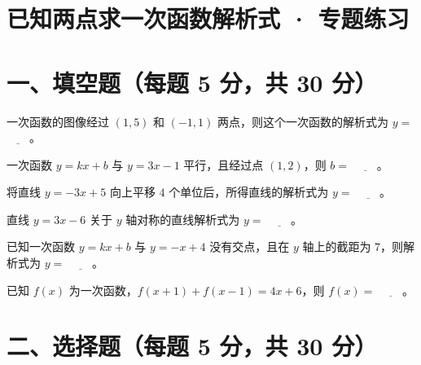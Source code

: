 \documentclass{exam-zh}
\begin{document}
\section*{已知两点求一次函数解析式 · 专题练习}

\section*{一、填空题（每题 5 分，共 30 分）}


\begin{question}[points=5]
  一次函数的图像经过 $(1, 5)$ 和 $(-1, 1)$ 两点，则这个一次函数的解析式为 $y = $ $\underline{\quad\quad}$。
  \fillin
\end{question}



\begin{question}[points=5]
  一次函数 $y = kx + b$ 与 $y = 3x - 1$ 平行，且经过点 $(1, 2)$，则 $b = $ $\underline{\quad\quad}$。
  \fillin
\end{question}



\begin{question}[points=5]
  将直线 $y = -3x + 5$ 向上平移 $4$ 个单位后，所得直线的解析式为 $y = $ $\underline{\quad\quad}$。
  \fillin
\end{question}



\begin{question}[points=5]
  直线 $y = 3x - 6$ 关于 $y$ 轴对称的直线解析式为 $y = $ $\underline{\quad\quad}$。
  \fillin
\end{question}



\begin{question}[points=5]
  已知一次函数 $y = kx + b$ 与 $y = -x + 4$ 没有交点，且在 $y$ 轴上的截距为 $7$，则解析式为 $y = $ $\underline{\quad\quad}$。
  \fillin
\end{question}



\begin{question}[points=5]
  已知 $f(x)$ 为一次函数，$f(x + 1) + f(x - 1) = 4x + 6$，则 $f(x) = $ $\underline{\quad\quad}$。
  \fillin
\end{question}


\section*{二、选择题（每题 5 分，共 30 分）}
\end{document}
